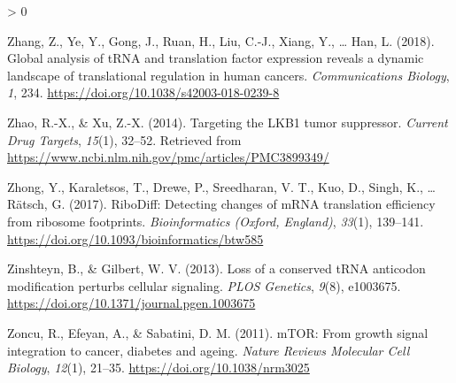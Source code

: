 \documentclass[
  12pt,
  openany]{book}
\newlength{\cslhangindent}
\newenvironment{CSLReferences}[2] %
 {%
  \setlength{\parindent}{0pt}
  \ifodd #1 \everypar{\setlength{\hangindent}{\cslhangindent}}\ignorespaces\fi
  \ifnum #2 > 0
  \setlength{\parskip}{#2\baselineskip}
  \fi
 }%
 {}
\begin{document}
\begin{CSLReferences}{1}{0}
\leavevmode\hypertarget{ref-Zhang2018}{}%
Zhang, Z., Ye, Y., Gong, J., Ruan, H., Liu, C.-J., Xiang, Y., \ldots{} Han, L. (2018). Global analysis of {tRNA} and translation factor expression reveals a dynamic landscape of translational regulation in human cancers. \emph{Communications Biology}, \emph{1}, 234. \url{https://doi.org/10.1038/s42003-018-0239-8}

\leavevmode\hypertarget{ref-Zhao2014}{}%
Zhao, R.-X., \& Xu, Z.-X. (2014). Targeting the {LKB}1 tumor suppressor. \emph{Current Drug Targets}, \emph{15}(1), 32--52. Retrieved from \url{https://www.ncbi.nlm.nih.gov/pmc/articles/PMC3899349/}

\leavevmode\hypertarget{ref-Zhong2017}{}%
Zhong, Y., Karaletsos, T., Drewe, P., Sreedharan, V. T., Kuo, D., Singh, K., \ldots{} Rätsch, G. (2017). {RiboDiff}: Detecting changes of {mRNA} translation efficiency from ribosome footprints. \emph{Bioinformatics (Oxford, England)}, \emph{33}(1), 139--141. \url{https://doi.org/10.1093/bioinformatics/btw585}

\leavevmode\hypertarget{ref-Zinshteyn2013}{}%
Zinshteyn, B., \& Gilbert, W. V. (2013). Loss of a conserved {tRNA} anticodon modification perturbs cellular signaling. \emph{{PLOS} Genetics}, \emph{9}(8), e1003675. \url{https://doi.org/10.1371/journal.pgen.1003675}

\leavevmode\hypertarget{ref-Zoncu2011}{}%
Zoncu, R., Efeyan, A., \& Sabatini, D. M. (2011). {mTOR}: From growth signal integration to cancer, diabetes and ageing. \emph{Nature Reviews Molecular Cell Biology}, \emph{12}(1), 21--35. \url{https://doi.org/10.1038/nrm3025}

\end{CSLReferences}
\end{document}

